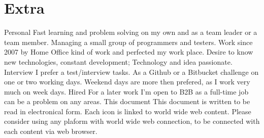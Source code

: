 

\section{Extra}

\cvline
    {Personal}
    {Fast learning and problem solving on my own and as a team leader or a team
    member. Managing a small group of programmers and testers. Work since 2007
    by Home Office kind of work and perfected my work place. Desire
    to know new technologies, constant development; Technology and idea passionate.}
    {}{}{}{}
\cvline
    {Interview}
    {I prefer a test/interview tasks. As a Github or a Bitbucket challenge on
    one or two working days. Weekend days are more then prefered, as I work
    very much on week days.}
    {}{}{}{}
\cvline
    {Hired}
    {For a later work I'm open to B2B as a full-time
    job can be a problem on any areas.}
    {}{}{}{}
\cvline
    {This document}
    {This document is written to be read in electronical form. Each icon is
    linked to world wide web content. Please consider using any plaform with
    world wide web connection, to be connected with each content via web
    browser.
    } {}{}{}{}
